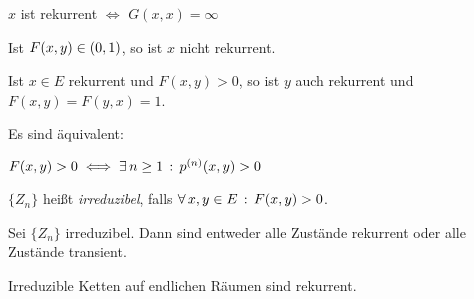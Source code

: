 \documentclass{cheat-sheet}
\begin{document}
\begin{kor}
  $x$ ist rekurrent $\iff$ $G(x, x) = \infty$
\end{kor}

\begin{lem}
  Ist $F(x, y) \in \left( 0, 1 \right)$, so ist $x$ nicht rekurrent.
\end{lem}

\begin{satz}
  Ist $x \in E$ rekurrent und $F(x, y) > 0$, so ist $y$ auch rekurrent und $F(x, y) = F(y, x) = 1$.
\end{satz}

\begin{satz}
  Es sind äquivalent:
  \begin{itemize}
  \end{itemize}
\end{satz}

\iffalse
\begin{interp}
  $F(x, y) > 0$ bedeutet, dass nach jedem Besuch in~$x$ der Zustand $y$ auch besucht wird mit positiver Wahrscheinlichkeit und die Rekurrenz von~$x$ bedeutet, dass $x$ unendlich oft besucht wird.
  Der Satz sagt, dass dann auch $y$ unendlich oft besucht wird.
\end{interp}
\fi

\begin{bem}
  $F(x, y) > 0 \iff \exists \, {n \geq 1} \,:\, p^{(n)}(x, y) > 0$
\end{bem}

\begin{defn}
  $\{ Z_n \}$ heißt \emph{irreduzibel}, falls $\forall \, {x, y \in E} \,:\, F(x, y) > 0$.
\end{defn}

\begin{satz}
  Sei $\{ Z_n \}$ irreduzibel.
  Dann sind entweder alle Zustände rekurrent oder alle Zustände transient.
\end{satz}


\begin{satz}
  Irreduzible Ketten auf endlichen Räumen sind rekurrent.
\end{satz}
\end{document}

